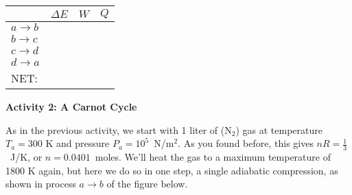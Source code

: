 \vspace{0.1 in}
{\renewcommand{\arraystretch}{2.0}
\begin{tabular}{| C{1in} |C{1in} | C{1in} | C{1in} |}
\hline
& $\Delta E$ & $W$ & $Q$ \\ \hline
$a \rightarrow b$ & & & \\ \hline
$b \rightarrow c$ & & & \\ \hline
$c \rightarrow d$ & & & \\ \hline
$d \rightarrow a$ & & & \\
\hhline{|=|=|=|=|}
NET: & & & \\ \hline
\end{tabular}
}

\vspace{0.3in}

\pagebreak
\textbf{Activity 2: A Carnot Cycle}

As in the previous activity, we start with 1 liter of ($\textrm{N}_2$) gas at temperature $T_a = 300$ K and pressure $P_a=10^5$~N/m$^2$.   As you found before, this gives $nR=\frac{1}{3}$~J/K, or $n=0.0401$~moles.  We'll heat the gas to a maximum temperature of 1800 K again, but here we do so in one step, a single adiabatic compression, as shown in process $a \rightarrow b$ of the figure below.


